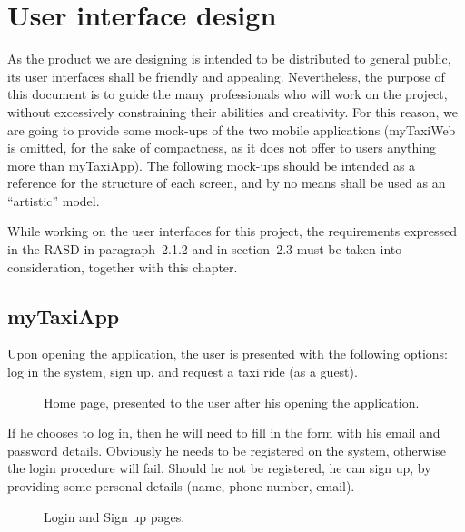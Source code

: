 \chapter{User interface design} \label{chap:userinterface}
As the product we are designing is intended to be distributed to general public, its user interfaces shall be friendly and appealing. Nevertheless, the purpose of this document is to guide the many professionals who will work on the project, without excessively constraining their abilities and creativity. For this reason, we are going to provide some mock-ups of the two mobile applications (myTaxiWeb is omitted, for the sake of compactness, as it does not offer to users anything more than myTaxiApp). The following mock-ups should be intended as a reference for the structure of each screen, and by no means shall be used as an ``artistic'' model.

While working on the user interfaces for this project, the requirements expressed in the RASD in paragraph~2.1.2 and in section~2.3 must be taken into consideration, together with this chapter.


\section{myTaxiApp}
Upon opening the application, the user is presented with the following options: log in the system, sign up, and request a taxi ride (as a guest).

\begin{figure}%
	\hfill%
	\hfill%
	\caption{Home page, presented to the user after his opening the application.}\label{fig:firstPage}
\end{figure}

\clearpage 

If he chooses to log in, then he will need to fill in the form with his email and password details. Obviously he needs to be registered on the system, otherwise the login procedure will fail. Should he not be registered, he can sign up, by providing some personal details (name, phone number, email).

\begin{figure}%
	\hfill%
	\hfill%
	\hfill%
	\caption{Login and Sign up pages.}\label{fig:loginSignup}
\end{figure}

